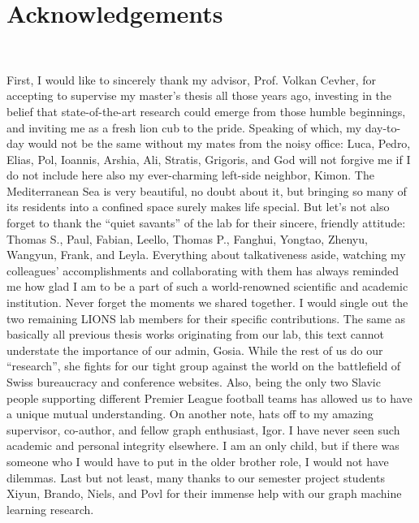 \chapter*{Acknowledgements}
~\newline~\newline~


First, I would like to sincerely thank my advisor, Prof. Volkan Cevher, for accepting to supervise my master's thesis all those years ago, investing in the belief that state-of-the-art research could emerge from those humble beginnings, and inviting me as a fresh lion cub to the pride. Speaking of which, my day-to-day would not be the same without my mates from the noisy office: Luca, Pedro, Elias, Pol, Ioannis, Arshia, Ali, Stratis, Grigoris, and God will not forgive me if I do not include here also my ever-charming left-side neighbor, Kimon. The Mediterranean Sea is very beautiful, no doubt about it, but bringing so many of its residents into a confined space surely makes life special. But let's not also forget to thank the \enquote{quiet savants} of the lab for their sincere, friendly attitude: Thomas S., Paul, Fabian, Leello, Thomas P., Fanghui, Yongtao, Zhenyu, Wangyun, Frank, and Leyla. Everything about talkativeness aside, watching my colleagues' accomplishments and collaborating with them has always reminded me how glad I am to be a part of such a world-renowned scientific and academic institution. Never forget the moments we shared together. I would single out the two remaining LIONS lab members for their specific contributions. The same as basically all previous thesis works originating from our lab, this text cannot understate the importance of our admin, Gosia. While the rest of us do our \enquote{research}, she fights for our tight group against the world on the battlefield of Swiss bureaucracy and conference websites. Also, being the only two Slavic people supporting different Premier League football teams has allowed us to have a unique mutual understanding. On another note, hats off to my amazing supervisor, co-author, and fellow graph enthusiast, Igor. I have never seen such academic and personal integrity elsewhere. I am an only child, but if there was someone who I would have to put in the older brother role, I would not have dilemmas. Last but not least, many thanks to our semester project students Xiyun, Brando, Niels, and Povl for their immense help with our graph machine learning research.

